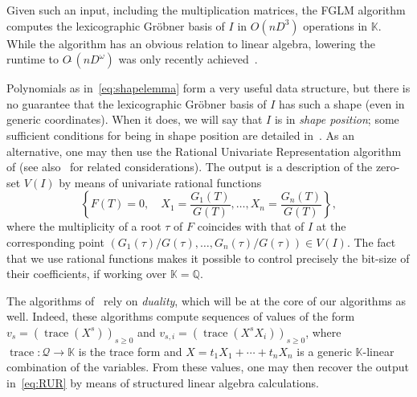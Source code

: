 \documentclass[final,1p,times,authoryear]{elsarticle}
\newcommand{\trace}{\operatorname{trace}}
\newcommand{\lf}{X}
\newcommand{\residueI}{\mathscr{Q}}
\def\Q {\ensuremath{\mathbb{Q}}}
\def\K{\mathbb{K}}
\def\K {\ensuremath{\mathbb{K}}}
\begin{document}
Given such an input, including the multiplication matrices, the FGLM
algorithm~\citep{FaGiLaMo93} computes the lexicographic Gr\"obner basis
of $I$ in $O(nD^3)$ operations in $\K$.  While the algorithm has an
obvious relation to linear algebra, lowering the runtime to
$O\tilde{~}(nD^\omega)$ was only recently
achieved~\citep{FaGaHuRe13,FaGaHuRe14,Neiger16}.

Polynomials as in~\cref{eq:shapelemma} form a very useful data
structure, but there is no guarantee that the lexicographic Gr\"obner
basis of $I$ has such a shape (even in generic coordinates). When it does, we will say that $I$ is
in {\em shape position}; some sufficient conditions for being in shape
position are detailed in~\citep{BeMoMaTr94}.  As an alternative, one
may then use the Rational Univariate Representation algorithm of
\citet{Rouillier99} (see also~\citep{AlBeRoWo94,BeWo96} for related
considerations). The output is a description of the zero-set $V(I)$ by
means of univariate rational functions
\begin{equation}\label{eq:RUR}
  \left\{  F(T)=0, \quad X_1 = \frac{G_1(T)}{G(T)}, \dots,X_n = \frac{G_n(T)}{G(T)} \right\},
\end{equation}
where the multiplicity of a root $\tau$ of $F$ coincides with that of
$I$ at the corresponding point
$(G_1(\tau)/G(\tau),\dots,G_n(\tau)/G(\tau)) \in V(I)$. The fact that
we use rational functions makes it possible to control
precisely the bit-size of their coefficients, if working over $\K=\Q$.

The algorithms of~\citet{AlBeRoWo94, BeWo96, Rouillier99} rely on
\emph{duality}, which will be at the core of our algorithms as well.
Indeed, these algorithms compute sequences of values of the form
$v_s=(\trace(\lf^s))_{s \ge 0}$ and 
$v_{s,i}=(\trace(\lf^s X_i))_{s \ge 0}$, where $\trace: \residueI \to \K$ is the trace 
form and $\lf=t_1 X_1 + \cdots + t_n X_n$ is a generic $\K$-linear combination of the variables.
From these values, one may then recover the output in~\cref{eq:RUR} by means
of structured linear algebra calculations.
\end{document}
